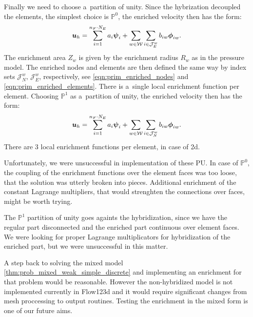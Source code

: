 Finally we need to choose a~partition of unity. Since the hybrization decoupled the elements,
the simplest choice is $\mathbb P^0$, 
the enriched velocity then has the form:
\begin{equation}
    \mathbf{\boldsymbol{u}}_h = 
    \sum \limits_{i=1}^{n_F\cdot N_E} a_i \mathbf{\boldsymbol{\psi}}_i + 
    \sum \limits_{w\in\mathcal{W}} \sum \limits_{i\in\mathcal{J}^w_E} b_{iw} \mathbf{\boldsymbol{\phi}}_{iw}.
\end{equation}
The enrichment area $Z_w$ is given by the enrichment radius $R_w$ as in the pressure model.
The enriched nodes and elements are then defined the same way by index sets $\mathcal{J}^w_N,\,\mathcal{J}^w_E$, respectively,
see \eqref{eqn:prim_enriched_nodes} and \eqref{eqn:prim_enriched_elements}.
There is a~single local enrichment function per element.
Choosing $\mathbb P^1$ as a~partition of unity,
the enriched velocity then has the form:
\begin{equation}
    \mathbf{\boldsymbol{u}}_h = 
    \sum \limits_{i=1}^{n_F\cdot N_E} a_i \mathbf{\boldsymbol{\psi}}_i + 
    \sum \limits_{w\in\mathcal{W}} \sum \limits_{i\in\mathcal{J}^w_N} b_{iw} \mathbf{\boldsymbol{\phi}}_{iw}.
\end{equation}
There are 3 local enrichment functions per element, in case of 2d.

Unfortunately, we were unsuccessful in implementation of these PU.
In case of $\mathbb P^0$, the coupling of the enrichment functions over the element faces was too loose,
that the solution was utterly broken into pieces.
Additional enrichment of the constant Lagrange multipliers, that would strenghten the connections over faces,
might be worth trying.

The $\mathbb P^1$ partition of unity goes againts the hybridization, since we have the regular part disconnected
and the enriched part continuous over element faces. We were looking for proper Lagrange multiplicators
for hybridization of the enriched part, but we were unsuccessful in this matter.

A step back to solving the mixed model \ref{thm:prob_mixed_weak_simple_discrete} and implementing an enrichment
for that problem would be reasonable. However the non-hybridized model is not implemented currently in Flow123d
and it would require significant changes from mesh proccessing to output routines.
Testing the enrichment in the mixed form is one of our future aims.


